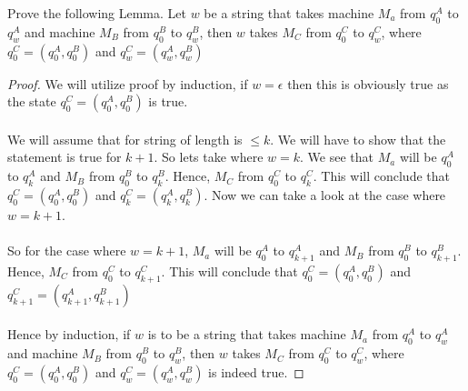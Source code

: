 \documentclass[12pt]{article}
\newenvironment{exercise}[2][Exercise]{\begin{trivlist}
\item[\hskip \labelsep {\bfseries #1}\hskip \labelsep {\bfseries #2.}]}{\end{trivlist}}
\begin{document}
\begin{exercise}{4}
Prove the following Lemma. Let $w$ be a string that takes machine $M_{a}$ from $q_{0}^{A}$ to $q_{w}^{A}$ and machine $M_{B}$ from $q_{0}^{B}$ to $q_{w}^{B}$, then $w$ takes $M_{C}$ from  $q_{0}^{C}$ to $q_{w}^{C}$, where  $q_{0}^{C} = (q_{0}^{A},q_{0}^{B})$ and $q_{w}^{C} = (q_{w}^{A},q_{w}^{B})$
\end{exercise}

\begin{proof}
We will utilize proof by induction, if $w = \epsilon$ then this is obviously true as the state $q_{0}^{C} = (q_{0}^{A},q_{0}^{B})$ is true. \\ \\
We will assume that for string of length is $\leq k$. We will have to show that the statement is true for $k+1$. So lets take where $w = k$. We see that $M_{a}$ will be $q_{0}^{A}$ to $q_{k}^{A}$ and $M_{B}$ from $q_{0}^{B}$ to $q_{k}^{B}$. Hence, $M_{C}$ from  $q_{0}^{C}$ to $q_{k}^{C}$. This will conclude that $q_{0}^{C} = (q_{0}^{A},q_{0}^{B})$ and $q_{k}^{C} = (q_{k}^{A},q_{k}^{B})$. Now we can take a look at the case where $w = k+1$. \\ \\
So for the case where $w = k+1$, $M_{a}$ will be $q_{0}^{A}$ to $q_{k+1}^{A}$ and $M_{B}$ from $q_{0}^{B}$ to $q_{k+1}^{B}$. Hence, $M_{C}$ from  $q_{0}^{C}$ to $q_{k+1}^{C}$. This will conclude that $q_{0}^{C} = (q_{0}^{A},q_{0}^{B})$ and $q_{k+1}^{C} = (q_{k+1}^{A},q_{k+1}^{B})$ \\ \\
Hence by induction, if $w$ is to be a string that takes machine $M_{a}$ from $q_{0}^{A}$ to $q_{w}^{A}$ and machine $M_{B}$ from $q_{0}^{B}$ to $q_{w}^{B}$, then $w$ takes $M_{C}$ from  $q_{0}^{C}$ to $q_{w}^{C}$, where  $q_{0}^{C} = (q_{0}^{A},q_{0}^{B})$ and $q_{w}^{C} = (q_{w}^{A},q_{w}^{B})$ is indeed true.

\end{proof}
\end{document}
